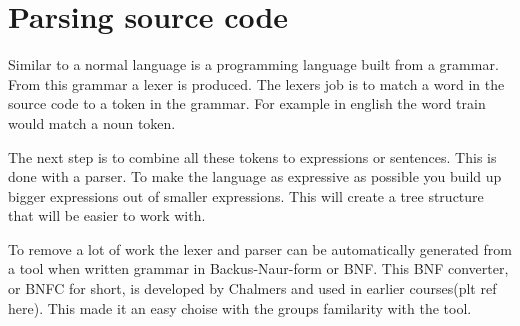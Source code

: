 \section{Parsing source code} \label{sec:bnfc}
Similar to a normal language is a programming language built from a grammar. 
From this grammar a lexer is produced. The lexers job is to match a word in the
source code to a token in the grammar. For example in english the word train 
would match a noun token. 

The next step is to combine all these tokens to expressions or sentences. This
is done with a parser. To make the language as expressive as possible you build
up bigger expressions out of smaller expressions. This will create a tree
structure that will be easier to work with. 

To remove a lot of work the lexer and parser can be automatically generated from
a tool when written grammar in Backus-Naur-form or BNF. This BNF converter, or
BNFC for short, is developed by Chalmers and used in earlier courses(plt ref here).
This made it an easy choise with the groups familarity with the tool. 


